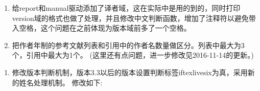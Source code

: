 \begin{enumerate}
\item 给report和manual驱动添加了译者域，这在实际中是用的到的，同时打印version域的格式也做了处理，并且修改中文判断函数，增加了注释符以避免带入空格，这个问题在之前体现为版本域前多了一个空格。
\begin{texlist}
\end{texlist}

\item 把作者年制的参考文献列表和引用中的作者名数量做区分。列表中最大为3个，引用中最大为1个。
(这里还有点问题，进一步修改见2016-11-14的更新。)
\begin{texlist}
%
\end{texlist}
\end{enumerate}

\begin{enumerate}
\item 修改版本判断机制，版本3.3以后的版本设置判断标签iftexlivesix为真，采用新的姓名处理机制。
修改如下:
\end{enumerate}

